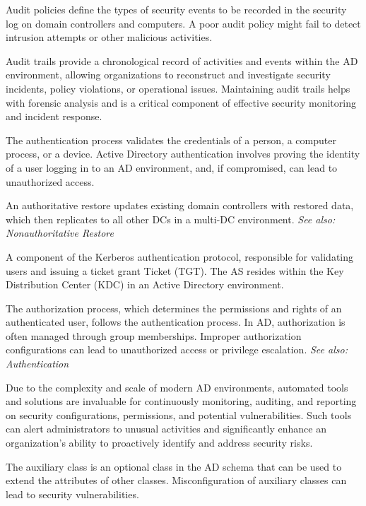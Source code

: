  Audit policies define the types of security events to be recorded in the security log on domain controllers and computers. A poor audit policy might fail to detect intrusion attempts or other malicious activities.

 Audit trails provide a chronological record of activities and events within the AD environment, allowing organizations to reconstruct and investigate security incidents, policy violations, or operational issues. Maintaining audit trails helps with forensic analysis and is a critical component of effective security monitoring and incident response.

 The authentication process validates the credentials of a person, a computer process, or a device. Active Directory authentication involves proving the identity of a user logging in to an AD environment, and, if compromised, can lead to unauthorized access.

 An authoritative restore updates existing domain controllers with restored data, which then replicates to all other DCs in a multi-DC environment.
\textit{See also: Nonauthoritative Restore}

 A component of the Kerberos authentication protocol, responsible for validating users and issuing a ticket grant Ticket (TGT). The AS resides within the Key Distribution Center (KDC) in an Active Directory environment.

 The authorization process, which determines the permissions and rights of an authenticated user, follows the authentication process. In AD, authorization is often managed through group memberships. Improper authorization configurations can lead to unauthorized access or privilege escalation.
\textit{See also: Authentication}

 Due to the complexity and scale of modern AD environments, automated tools and solutions are invaluable for continuously monitoring, auditing, and reporting on security configurations, permissions, and potential vulnerabilities. Such tools can alert administrators to unusual activities and significantly enhance an organization’s ability to proactively identify and address security risks.

 The auxiliary class is an optional class in the AD schema that can be used to extend the attributes of other classes. Misconfiguration of auxiliary classes can lead to security vulnerabilities.

